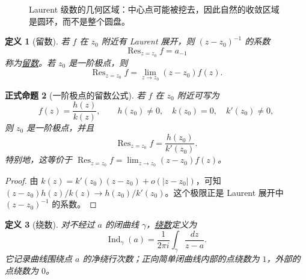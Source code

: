 \documentclass[UTF8,fontset=none,a4paper,11pt]{ctexart}
\theoremstyle{foundation-definition}
\newtheorem{definition}{定义}[section]
\theoremstyle{foundation-theorem}
\theoremstyle{foundation-proposition}
\newtheorem{proposition}[definition]{正式命题}
\theoremstyle{foundation-example}
\theoremstyle{foundation-remark}
\theoremstyle{foundation-theorem}
\newcommand{\term}[2]{\hyperref[#1]{#2}}
\begin{document}
\begin{figure}[htbp]
\centering
{}
\caption{Laurent 级数的几何区域：中心点可能被挖去，因此自然的收敛区域是圆环，而不是整个圆盘。}
\label{fig:laurent-annulus}
\end{figure}

\begin{definition}[留数]\label{def:residue}
若 \(f\) 在 \(z_0\) 附近有 Laurent 展开，则 \((z-z_0)^{-1}\) 的系数
\[
\operatorname{Res}_{z=z_0}f=a_{-1}
\]
称为\term{def:residue}{留数}。若 \(z_0\) 是一阶极点，则
\[
\operatorname{Res}_{z=z_0}f
=\lim_{z\to z_0}(z-z_0)f(z).
\]
\end{definition}

\begin{proposition}[一阶极点的留数公式]\label{prop:simple-pole-residue}
若 \(f\) 在 \(z_0\) 附近可写为
\[
f(z)=\frac{h(z)}{k(z)},
\qquad h(z_0)\ne0,\quad k(z_0)=0,\quad k'(z_0)\ne0,
\]
则 \(z_0\) 是一阶极点，并且
\[
\operatorname{Res}_{z=z_0}f=\frac{h(z_0)}{k'(z_0)}.
\]
特别地，这等价于
\(\operatorname{Res}_{z=z_0}f=\lim_{z\to z_0}(z-z_0)f(z)\)。
\end{proposition}

\begin{proof}
由 \(k(z)=k'(z_0)(z-z_0)+o(|z-z_0|)\)，可知
\((z-z_0)h(z)/k(z)\to h(z_0)/k'(z_0)\)。这个极限正是 Laurent 展开中
\((z-z_0)^{-1}\) 的系数。
\end{proof}

\begin{definition}[绕数]\label{def:winding-number}
对不经过 \(a\) 的闭曲线 \(\gamma\)，\term{def:winding-number}{绕数}定义为
\[
\operatorname{Ind}_{\gamma}(a)=\frac{1}{2\pi i}
\int_{\gamma}\frac{dz}{z-a}.
\]
它记录曲线围绕点 \(a\) 的净绕行次数；正向简单闭曲线内部的点绕数为 \(1\)，外部的点绕数为 \(0\)。
\end{definition}
\end{document}
